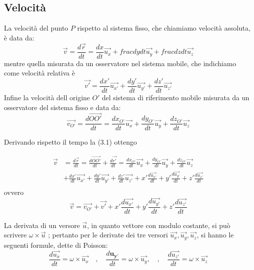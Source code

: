 \documentclass[class=book, crop=false, oneside, 12pt]{standalone}
\begin{document}
\subsection{Velocità}

La velocità del punto \(P\) rispetto al sistema fisso, che chiamiamo velocità assoluta, è data da:
\begin{equation}
    \overrightarrow{v} = \frac{d \overrightarrow{r}}{dt} = \frac{dx}{dt} \overrightarrow{u_x} + frac{dy}{dt} \overrightarrow{u_y} + frac{dz}{dt} \overrightarrow{u_z}
\end{equation}
mentre quella misurata da un osservatore nel sistema mobile, che indichiamo come velocità relativa è
\begin{equation}
    \overrightarrow{v'} = \frac{dx'}{dt} \overrightarrow{u_{x'}} +\frac{dy'}{dt} \overrightarrow{u_{y'}} + \frac{dz'}{dt} \overrightarrow{u_{z'}}
\end{equation}
Infine la velocità dell origine \(O'\) del sistema di riferimento mobile misurata da un osservatore del sistema fisso e data da:
\begin{equation}
    \overrightarrow{v_{O'}}=\frac{d \overrightarrow{OO'}}{d t}=\frac{d x_{O'}}{d t} \overrightarrow{u_{x}}+\frac{d y_{O'}}{d t} \overrightarrow{u_{y}}+\frac{d z_{O'}}{d t} \overrightarrow{u_{z}}
\end{equation}

Derivando rispetto il tempo la (3.1) ottengo

\begin{align*}
    \overrightarrow{v}&=\frac{d \overrightarrow{r}}{dt} = \frac{d \overrightarrow{OO'}}{d t} + \frac{d \overrightarrow{r'}}{dt} = \frac{d x_{O'}}{d t} \overrightarrow{u_{x}}+\frac{d y_{O'}}{d t} \overrightarrow{u_{y}}+\frac{d z_{O'}}{d t} \overrightarrow{u_{z}}\\
    &+\frac{dx'}{dt} \overrightarrow{u_{x'}} + \frac{dy'}{dt} \overrightarrow{u_{y'}} + \frac{dz'}{dt} \overrightarrow{u_{z'}} + x' \frac{d\overrightarrow{u_{x'}}}{dt}  + y' \frac{d\overrightarrow{u_{y'}}}{dt}  + z' \frac{d\overrightarrow{u_{z'}}}{dt}\\
\end{align*}
ovvero
\begin{equation}
    \overrightarrow{v} = \overrightarrow{v_{O'}} + \overrightarrow{v'} + x' \frac{d\overrightarrow{u_{x'}}}{dt}  + y' \frac{d\overrightarrow{u_{y'}}}{dt}  + z' \frac{d\overrightarrow{u_{z'}}}{dt}
\end{equation}

La derivata di un versore \(\overrightarrow{u}\), in quanto vettore con modulo costante, si può scrivere \(\omega \times \overrightarrow{u}\) ; pertanto per le derivate dei tre versori \(\overrightarrow{u_x},\overrightarrow{u_y},\overrightarrow{u_z}\), si hanno le seguenti formule, dette di Poisson:
\begin{equation}
    \frac{d \overrightarrow{u_{x}}}{d t}=\omega \times \overrightarrow{u_{x}} \quad, \quad \frac{d \mathbf{u_{y'}}}{d t}=\omega \times \overrightarrow{u_{y}}, \quad, \quad \frac{d \overrightarrow{u_{z'}}}{d t}=\omega \times \overrightarrow{u_{z}}
\end{equation} 
\end{document}
